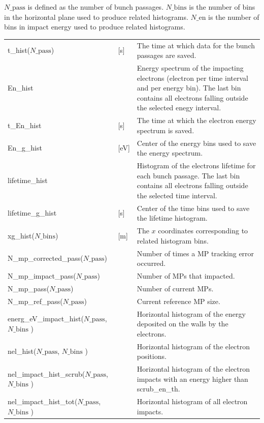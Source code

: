 \documentclass[a4paper,12pt]{article}
\begin{document}
$N\_{\mathrm{pass}}$ is defined as the number of bunch passages.
$N\_{\mathrm{bins}}$ is the number of bins in the horizontal plane used to produce related histograms.
$N\_\mathrm{en}$ is the number of bins in impact energy used to produce related histograms.
\begin{longtable}
    {p{}p{}p{}}
    \hline\endfirsthead\hline\endhead
    \rowcolor{Gray}\multicolumn{3}{p{.97\textwidth}}{
    \textbf{Variables saved at each bunch passage}}
    \\\hline
    t\_hist($N\_{\mathrm{pass}}$) & [s] & The time at which data for the bunch passages are saved.\\\hline

    En\_hist &  & Energy spectrum of the impacting electrons (electron per time interval and per energy bin). The last bin contains all electrons falling outside the selected enegy interval. \\\hline
    t\_En\_hist & [s] & The time at which the electron energy spectrum is saved.\\\hline
    En\_g\_hist &[eV]& Center of the energy bins used to save the energy spectrum.\\\hline

    lifetime\_hist &  & Histogram of the electrons lifetime for each bunch passage. The last bin contains all electrons falling outside the selected time interval. \\\hline
    lifetime\_g\_hist &[s]& Center of the time bins used to save the lifetime histogram.\\\hline

    xg\_hist($N\_{\mathrm{bins}}$) & [m] & The $x$ coordinates corresponding to related histogram bins.\\\hline

    N\_mp\_corrected\_pass($N\_{\mathrm{pass}}$) & & Number of times a MP tracking error occurred. \\\hline
    N\_mp\_impact\_pass($N\_{\mathrm{pass}}$) & & Number of MPs that impacted. \\\hline
    N\_mp\_pass($N\_{\mathrm{pass}}$) & & Number of current MPs.\\\hline
    N\_mp\_ref\_pass($N\_{\mathrm{pass}}$) & & Current reference MP size.\\\hline
    energ\_eV\_impact\_hist($N\_{\mathrm{pass}}$, $N\_{\mathrm{bins}}$ ) & & Horizontal histogram of the energy deposited on the walls by the electrons.\\\hline
    nel\_hist($N\_{\mathrm{pass}}$, $N\_{\mathrm{bins}}$ ) & & Horizontal histogram of the electron positions.\\\hline
    nel\_impact\_hist\_scrub($N\_{\mathrm{pass}}$, $N\_{\mathrm{bins}}$ ) & & Horizontal histogram of the electron impacts with an energy higher than scrub\_en\_th.\\\hline
    nel\_impact\_hist\_tot($N\_{\mathrm{pass}}$, $N\_{\mathrm{bins}}$ ) & & Horizontal histogram of all electron impacts.\\\hline
\end{longtable}
\end{document}
